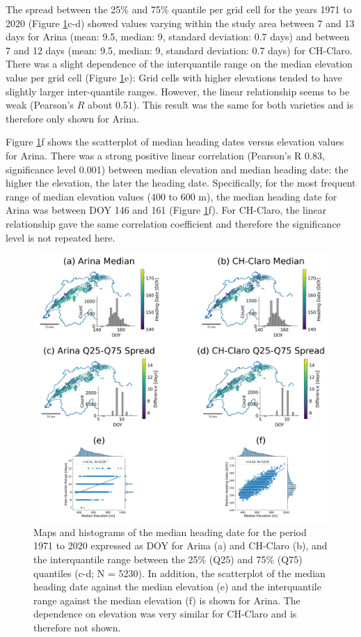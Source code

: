 The spread between the 25\% and 75\% quantile per grid cell for the years 1971 to 2020 (Figure \ref{fig:median-heading-map}c-d) showed values varying within the study area between 7 and 13 days for Arina (mean: 9.5, median: 9, standard deviation: 0.7 days) and between 7 and 12 days (mean: 9.5, median: 9, standard deviation: 0.7 days) for CH-Claro. There was a slight dependence of the interquantile range on the median elevation value per grid cell (Figure \ref{fig:median-heading-map}e): Grid cells with higher elevations tended to have slightly larger inter-quantile ranges. However, the linear relationship seems to be weak (Pearson's $R$ about 0.51). This result was the same for both varieties and is therefore only shown for Arina.

Figure \ref{fig:median-heading-map}f shows the scatterplot of median heading dates versus elevation values for Arina. There was a strong positive linear correlation (Pearson's R 0.83, significance level 0.001) between median elevation and median heading date: the higher the elevation, the later the heading date. Specifically, for the most frequent range of median elevation values (400 to 600 m), the median heading date for Arina was between \gls{DOY} 146 and 161 (Figure \ref{fig:median-heading-map}f). For CH-Claro, the linear relationship gave the same correlation coefficient and therefore the significance level is not repeated here.

\begin{figure}[H]
    \centering
    \includegraphics[width=\textwidth]{03-Heading-Dates/img/stats_map.png}
    \caption{Maps and histograms of the median heading date for the period 1971 to 2020 expressed as \gls{DOY} for Arina (a) and CH-Claro (b), and the interquantile range between the 25\% (Q25) and 75\% (Q75) quantiles (c-d; N = 5230). In addition, the scatterplot of the median heading date against the median elevation (e) and the interquantile range against the median elevation (f) is shown for Arina. The dependence on elevation was very similar for CH-Claro and is therefore not shown.}
    \label{fig:median-heading-map}
\end{figure}


